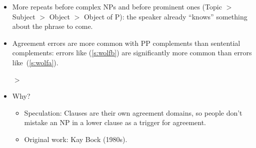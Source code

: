 \documentclass[a4paper,landscape,headrule,footrule]{foils}
\begin{document}
\begin{center}
\end{center}
\vspace{-1ex}
\begin{itemize}\addtolength{\itemsep}{-1ex}
\item More repeats before complex NPs and before prominent ones
  (Topic $>$ Subject $>$ Object $>$ Object of P): the speaker already
  ``knows'' something about the phrase to come.
\end{itemize}


\begin{itemize}
\item Agreement errors are more common with PP complements than
  sentential complements: errors like (\ref{s:wolfb}) are
  significantly more common than errors like~(\ref{s:wolfa}).
  \begin{exe}
    \ix\label{s:wolfa} 
    
    \ix\label{s:wolfb} $>$ 
  \end{exe}
\item Why?
  \begin{itemize}
  \item Speculation: Clauses are their own 
    agreement domains, so people don’t 
    mistake an NP in a lower clause as a trigger 
    for agreement.
  \item Original work: Kay Bock (1980s).
  \end{itemize}
\end{itemize}

\end{document}
